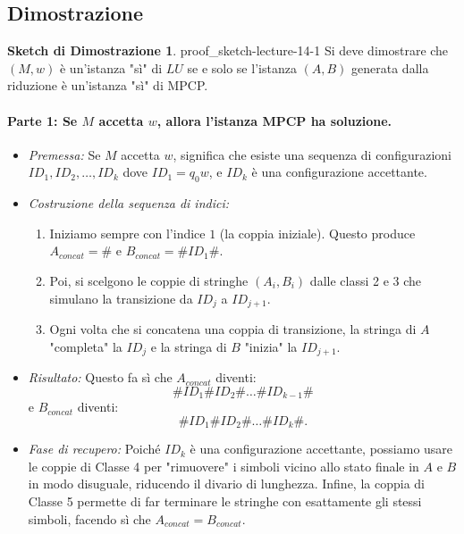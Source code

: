\documentclass[a4paper]{article}
\theoremstyle{definition} %
\newtheorem{proof_sketch}{Sketch di Dimostrazione} %
\theoremstyle{remark} %
\begin{document}
\subsection{Dimostrazione}
\begin{proof_sketch}{}{{ proof_sketch-lecture-14-1 }}
Si deve dimostrare che $(M, w)$ è un'istanza "sì" di $LU$ se e solo se l'istanza $(A, B)$ generata dalla riduzione è un'istanza "sì" di MPCP.

\paragraph{Parte 1: Se $M$ accetta $w$, allora l'istanza MPCP ha soluzione.}

\begin{itemize}
    \item \emph{Premessa:} Se $M$ accetta $w$, significa che esiste una sequenza di configurazioni $ID_1, ID_2, \dots, ID_k$ dove $ID_1 = q_0 w$, e $ID_k$ è una configurazione accettante.
    
    \item \emph{Costruzione della sequenza di indici:}
    \begin{enumerate}
        \item Iniziamo sempre con l'indice $1$ (la coppia iniziale). Questo produce $A_{concat} = \#$ e $B_{concat} = \#ID_1\#$.
        \item Poi, si scelgono le coppie di stringhe $(A_i, B_i)$ dalle classi 2 e 3 che simulano la transizione da $ID_j$ a $ID_{j+1}$. 
        \item Ogni volta che si concatena una coppia di transizione, la stringa di $A$ "completa" la $ID_j$ e la stringa di $B$ "inizia" la $ID_{j+1}$.
    \end{enumerate}
    
    \item \emph{Risultato:} Questo fa sì che $A_{concat}$ diventi:
    \[
        \#ID_1\#ID_2\# \dots \#ID_{k-1}\#
    \]
    e $B_{concat}$ diventi:
    \[
        \#ID_1\#ID_2\# \dots \#ID_k\#.
    \]

    \item \emph{Fase di recupero:} Poiché $ID_k$ è una configurazione accettante, possiamo usare le coppie di Classe 4 per "rimuovere" i simboli vicino allo stato finale in $A$ e $B$ in modo disuguale, riducendo il divario di lunghezza. Infine, la coppia di Classe 5 permette di far terminare le stringhe con esattamente gli stessi simboli, facendo sì che $A_{concat} = B_{concat}$.
    

\end{itemize}
\end{proof_sketch}
\end{document}
